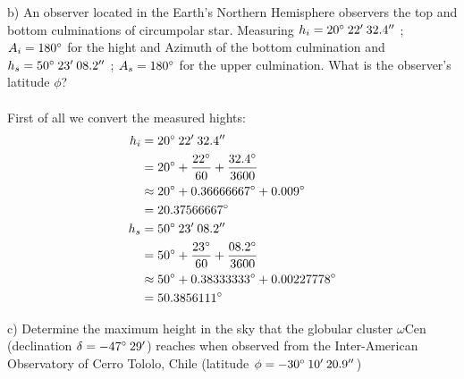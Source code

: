 \noindent{}
\noindent
b) An observer located in the Earth's Northern Hemisphere observers the top and bottom culminations of
circumpolar star. Measuring $h_i = 20 \degree \: 22' \: 32.4''$ ; $A_i = 180 \degree$ for the hight and
Azimuth of the bottom culmination and $h_s = 50 \degree \: 23' \: 08.2''$ ; $A_s = 180 \degree$ for the
upper culmination. What is the observer's latitude $\phi$?\\
\\
First of all we convert the measured hights:
\begin{equation*}
    \begin{split}
        h_i &= 20 \degree \: 22' \: 32.4''\\
            &= 20 \degree + \frac{22 \degree}{60} + \frac{32.4 \degree}{3600}\\
            &\approx 20 \degree + 0.36666667 \degree + 0.009 \degree\\
            &= 20.37566667 \degree\\
        h_s &= 50 \degree \: 23' \: 08.2''\\
            &= 50 \degree + \frac{23 \degree}{60} + \frac{08.2 \degree}{3600}\\
            &\approx 50 \degree + 0.38333333 \degree + 0.00227778\degree\\
            &= 50.3856111 \degree\\
    \end{split}
\end{equation*}

\noindent
c) Determine the maximum height in the sky that the globular cluster $\omega$Cen (declination 
$\delta = -47 \degree \: 29'$) reaches when observed from the Inter-American Observatory of Cerro Tololo,
Chile (latitude $\phi = -30 \degree \: 10' \: 20.9''$)\\
\\

